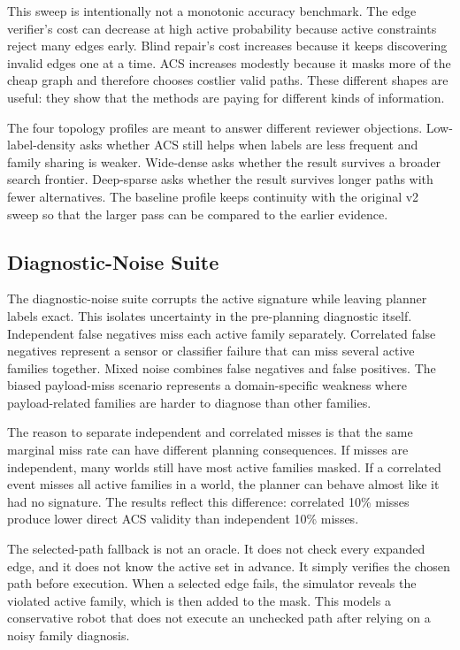 \documentclass{article}
\newcommand{\ACS}{\textsc{ACS}}
\begin{document}
This sweep is intentionally not a monotonic accuracy benchmark. The edge verifier's cost can decrease at high active probability because active constraints reject many edges early. Blind repair's cost increases because it keeps discovering invalid edges one at a time. \ACS{} increases modestly because it masks more of the cheap graph and therefore chooses costlier valid paths. These different shapes are useful: they show that the methods are paying for different kinds of information.

The four topology profiles are meant to answer different reviewer objections. Low-label-density asks whether \ACS{} still helps when labels are less frequent and family sharing is weaker. Wide-dense asks whether the result survives a broader search frontier. Deep-sparse asks whether the result survives longer paths with fewer alternatives. The baseline profile keeps continuity with the original v2 sweep so that the larger pass can be compared to the earlier evidence.

\subsection{Diagnostic-Noise Suite}

The diagnostic-noise suite corrupts the active signature while leaving planner labels exact. This isolates uncertainty in the pre-planning diagnostic itself. Independent false negatives miss each active family separately. Correlated false negatives represent a sensor or classifier failure that can miss several active families together. Mixed noise combines false negatives and false positives. The biased payload-miss scenario represents a domain-specific weakness where payload-related families are harder to diagnose than other families.

The reason to separate independent and correlated misses is that the same marginal miss rate can have different planning consequences. If misses are independent, many worlds still have most active families masked. If a correlated event misses all active families in a world, the planner can behave almost like it had no signature. The results reflect this difference: correlated 10\% misses produce lower direct \ACS{} validity than independent 10\% misses.

The selected-path fallback is not an oracle. It does not check every expanded edge, and it does not know the active set in advance. It simply verifies the chosen path before execution. When a selected edge fails, the simulator reveals the violated active family, which is then added to the mask. This models a conservative robot that does not execute an unchecked path after relying on a noisy family diagnosis.
\end{document}
